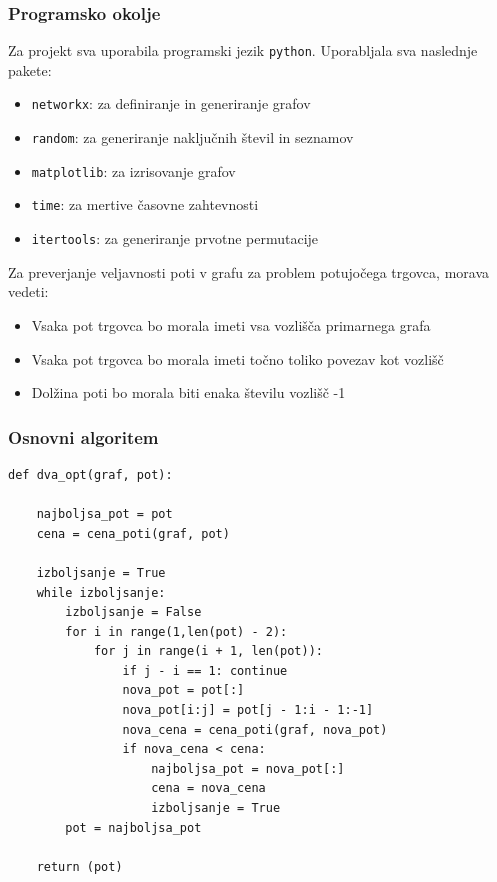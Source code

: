 \documentclass[8pt]{beamer}
\begin{document}
\begin{frame}
\frametitle{Programsko okolje}
Za projekt sva uporabila programski jezik \texttt{python}. Uporabljala sva naslednje pakete:

\begin{itemize}
\setlength\itemsep{1em}
\item \texttt{networkx}: za definiranje in generiranje grafov

\item \texttt{random}: za generiranje naključnih števil in seznamov

\item \texttt{matplotlib}: za izrisovanje grafov

\item \texttt{time}: za mertive časovne zahtevnosti

\item \texttt{itertools}: za generiranje prvotne permutacije

\end{itemize}


Za preverjanje veljavnosti poti v grafu za problem potujočega trgovca, morava vedeti:

\begin{itemize}
\setlength\itemsep{1em}
\item Vsaka pot trgovca bo morala imeti vsa vozlišča primarnega grafa
\item Vsaka pot trgovca bo morala imeti točno toliko povezav kot vozlišč
\item Dolžina poti bo morala biti enaka številu vozlišč -1
\end{itemize}
\end{frame}

\begin{frame}[fragile]
\frametitle{Osnovni algoritem}
\begin{verbatim}
def dva_opt(graf, pot):

    najboljsa_pot = pot
    cena = cena_poti(graf, pot)    
    
    izboljsanje = True
    while izboljsanje:
        izboljsanje = False
        for i in range(1,len(pot) - 2):
            for j in range(i + 1, len(pot)):
                if j - i == 1: continue
                nova_pot = pot[:]
                nova_pot[i:j] = pot[j - 1:i - 1:-1]
                nova_cena = cena_poti(graf, nova_pot)
                if nova_cena < cena:
                    najboljsa_pot = nova_pot[:]
                    cena = nova_cena
                    izboljsanje = True
        pot = najboljsa_pot
        
    return (pot)
\end{verbatim}
\end{frame}
\end{document}
